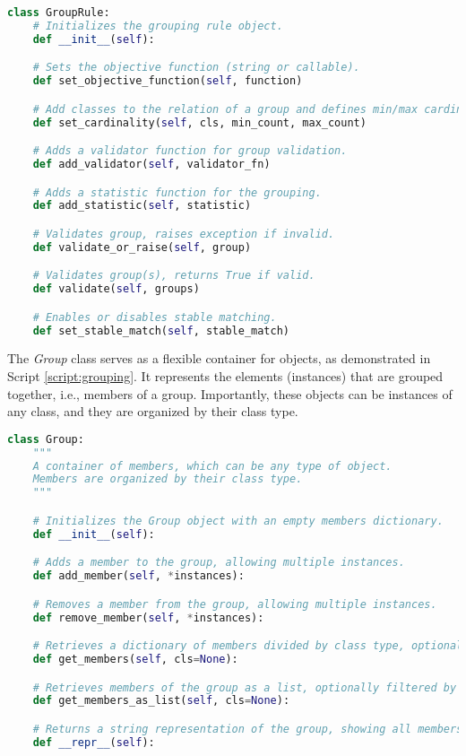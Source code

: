         \begin{lstlisting}[language=Python, caption={\textit{GroupRule} class that defines valid \textit{Groups} and its specifications. Such as min/max cardinality of each relation, group validation functions, statistic functions, and object function.}, label={script:groupingrule}]
class GroupRule:
    # Initializes the grouping rule object.
    def __init__(self):

    # Sets the objective function (string or callable).
    def set_objective_function(self, function)

    # Add classes to the relation of a group and defines min/max cardinality for this class' relation.
    def set_cardinality(self, cls, min_count, max_count)

    # Adds a validator function for group validation.
    def add_validator(self, validator_fn)

    # Adds a statistic function for the grouping.
    def add_statistic(self, statistic)

    # Validates group, raises exception if invalid.
    def validate_or_raise(self, group)

    # Validates group(s), returns True if valid.
    def validate(self, groups)

    # Enables or disables stable matching.
    def set_stable_match(self, stable_match)
\end{lstlisting}

    The \textit{Group} class serves as a flexible container for objects, as demonstrated in Script \ref{script:grouping}. It represents the elements (instances) that are grouped together, i.e., members of a group. Importantly, these objects can be instances of any class, and they are organized by their class type.

    \begin{lstlisting}[language=Python, caption={\textit{Group} Class. It represents the elements (instances) that are grouped together.}, label={script:grouping}]
class Group:
    """
    A container of members, which can be any type of object.
    Members are organized by their class type.
    """

    # Initializes the Group object with an empty members dictionary.
    def __init__(self):

    # Adds a member to the group, allowing multiple instances.
    def add_member(self, *instances):

    # Removes a member from the group, allowing multiple instances.
    def remove_member(self, *instances):

    # Retrieves a dictionary of members divided by class type, optionally filtered by only one class type.
    def get_members(self, cls=None):

    # Retrieves members of the group as a list, optionally filtered by class type.
    def get_members_as_list(self, cls=None):

    # Returns a string representation of the group, showing all members and their types.
    def __repr__(self):
    \end{lstlisting}


